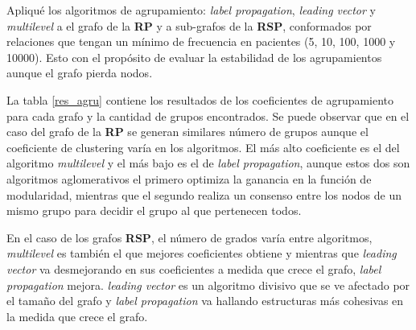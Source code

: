 Apliqué los algoritmos de agrupamiento: \textit{label propagation}, \textit{leading vector} y \textit{multilevel} a el grafo de la \textbf{RP} y a sub-grafos de la \textbf{RSP}, conformados por relaciones que tengan un mínimo de frecuencia en pacientes (\num{5}, \num{10}, \num{100}, \num{1000} y \num{10000}). Esto con el propósito de evaluar la estabilidad de los agrupamientos aunque el grafo pierda nodos.

La tabla \ref{res_agru} contiene los resultados de los coeficientes de agrupamiento para cada grafo y la cantidad de grupos encontrados. Se puede observar que en el caso del grafo de la \textbf{RP} se generan similares número de grupos aunque el coeficiente de clustering varía en los algoritmos. El más alto coeficiente es el del algoritmo \textit{multilevel} y el más bajo es el de \textit{label propagation}, aunque estos dos son algoritmos aglomerativos el primero optimiza la ganancia en la función de modularidad, mientras que el segundo realiza un consenso entre los nodos de un mismo grupo para decidir el grupo al que pertenecen todos.

En el caso de los grafos \textbf{RSP}, el número de grados varía entre algoritmos, \textit{multilevel} es también el que mejores coeficientes obtiene y mientras que \textit{leading vector} va desmejorando en sus coeficientes a medida que crece el grafo, \textit{label propagation} mejora. \textit{leading vector} es un algoritmo divisivo que se ve afectado por el tamaño del grafo y \textit{label propagation} va hallando estructuras más cohesivas en la medida que crece el grafo.


